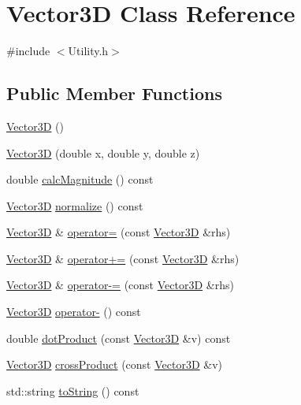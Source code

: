 \hypertarget{class_vector3_d}{\section{Vector3\-D Class Reference}
\label{class_vector3_d}
}


{\ttfamily \#include $<$Utility.\-h$>$}

\subsection*{Public Member Functions}
\begin{DoxyCompactItemize}
\item 
\hyperlink{class_vector3_d_a0b11a8d75da427b27443d8a94d0d296c}{Vector3\-D} ()
\item 
\hyperlink{class_vector3_d_abd851542da40b1168edcad11fa83b7c2}{Vector3\-D} (double x, double y, double z)
\item 
double \hyperlink{class_vector3_d_a9e900adfd823b6293f1bf01d84b9fff6}{calc\-Magnitude} () const 
\item 
\hyperlink{class_vector3_d}{Vector3\-D} \hyperlink{class_vector3_d_a5b3059961eb8b4db3dc6b79f283dcac1}{normalize} () const 
\item 
\hyperlink{class_vector3_d}{Vector3\-D} \& \hyperlink{class_vector3_d_a65c133291142447f6bdbdc4425303078}{operator=} (const \hyperlink{class_vector3_d}{Vector3\-D} \&rhs)
\item 
\hyperlink{class_vector3_d}{Vector3\-D} \& \hyperlink{class_vector3_d_a3448ab3b394051519147d76647e7f006}{operator+=} (const \hyperlink{class_vector3_d}{Vector3\-D} \&rhs)
\item 
\hyperlink{class_vector3_d}{Vector3\-D} \& \hyperlink{class_vector3_d_a571ef878a82e754c9280c9f4eb2d990b}{operator-\/=} (const \hyperlink{class_vector3_d}{Vector3\-D} \&rhs)
\item 
\hyperlink{class_vector3_d}{Vector3\-D} \hyperlink{class_vector3_d_a03f189f8d45eda497772364d19d30c7d}{operator-\/} () const 
\item 
double \hyperlink{class_vector3_d_a9eea2c879cc0721b71925088fecbab9c}{dot\-Product} (const \hyperlink{class_vector3_d}{Vector3\-D} \&v) const 
\item 
\hyperlink{class_vector3_d}{Vector3\-D} \hyperlink{class_vector3_d_a39ad41be410fec3615f471bde6e17321}{cross\-Product} (const \hyperlink{class_vector3_d}{Vector3\-D} \&v)
\item 
std\-::string \hyperlink{class_vector3_d_a37dfc4a95d1af4ce314852b54a2f6227}{to\-String} () const 
\end{DoxyCompactItemize}
